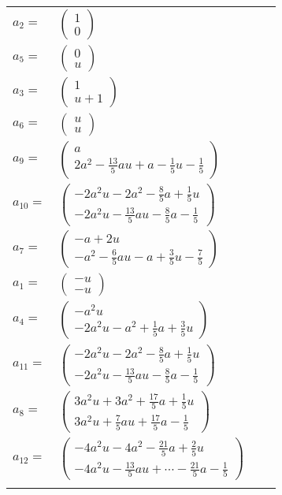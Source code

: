 \documentclass[1p]{elsarticle_modified}
\theoremstyle{definition}
\begin{document}
\begin{tabular}{m{7pt} m{180pt} m{7pt} m{180pt} }
\flushright $a_{2}=$&$\begin{pmatrix}1\\0\end{pmatrix}$ \\
\flushright $a_{5}=$&$\begin{pmatrix}0\\u\end{pmatrix}$ \\
\flushright $a_{3}=$&$\begin{pmatrix}1\\u+1\end{pmatrix}$ \\
\flushright $a_{6}=$&$\begin{pmatrix}u\\u\end{pmatrix}$ \\
\flushright $a_{9}=$&$\begin{pmatrix}a\\2 a^2-\frac{13}{5} a u+a-\frac{1}{5} u-\frac{1}{5}\end{pmatrix}$ \\
\flushright $a_{10}=$&$\begin{pmatrix}-2 a^2 u-2 a^2-\frac{8}{5} a+\frac{1}{5} u\\-2 a^2 u-\frac{13}{5} a u-\frac{8}{5} a-\frac{1}{5}\end{pmatrix}$ \\
\flushright $a_{7}=$&$\begin{pmatrix}- a+2 u\\- a^2-\frac{6}{5} a u- a+\frac{3}{5} u-\frac{7}{5}\end{pmatrix}$ \\
\flushright $a_{1}=$&$\begin{pmatrix}- u\\- u\end{pmatrix}$ \\
\flushright $a_{4}=$&$\begin{pmatrix}- a^2 u\\-2 a^2 u- a^2+\frac{1}{5} a+\frac{3}{5} u\end{pmatrix}$ \\
\flushright $a_{11}=$&$\begin{pmatrix}-2 a^2 u-2 a^2-\frac{8}{5} a+\frac{1}{5} u\\-2 a^2 u-\frac{13}{5} a u-\frac{8}{5} a-\frac{1}{5}\end{pmatrix}$ \\
\flushright $a_{8}=$&$\begin{pmatrix}3 a^2 u+3 a^2+\frac{17}{5} a+\frac{1}{5} u\\3 a^2 u+\frac{7}{5} a u+\frac{17}{5} a-\frac{1}{5}\end{pmatrix}$ \\
\flushright $a_{12}=$&$\begin{pmatrix}-4 a^2 u-4 a^2-\frac{21}{5} a+\frac{2}{5} u\\-4 a^2 u-\frac{13}{5} a u+\cdots-\frac{21}{5} a-\frac{1}{5}\end{pmatrix}$\\&\end{tabular}
\end{document}

